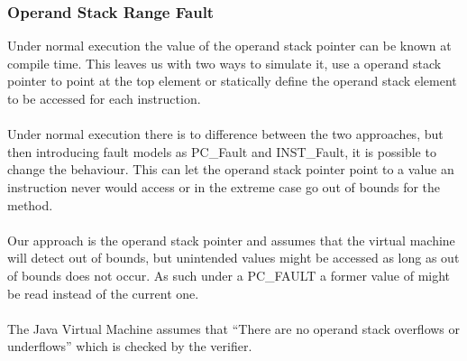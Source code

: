 \subsubsection{Operand Stack Range Fault}
Under normal execution the value of the operand stack pointer can be known at compile  time. This leaves us with two ways to simulate it, use a operand stack pointer to point at the top element or statically define the operand stack element to be accessed for each instruction.\\\\
Under normal execution there is to difference between the two approaches, but then introducing fault models as PC\_Fault and INST\_Fault, it is possible to change the behaviour. This can let the operand stack pointer point to a value an instruction never would access or in the extreme case go out of bounds for the method.\\\\
Our approach is the operand stack pointer and assumes that the virtual machine will detect out of bounds, but unintended values might be accessed as long as out of bounds does not occur. As such under a PC\_FAULT a former value of might be read instead of the current one.\\\\
The Java Virtual Machine assumes that ``There are no operand stack overflows or underflows'' \cite[c. 4.10]{java_spec} which is checked by the verifier.

